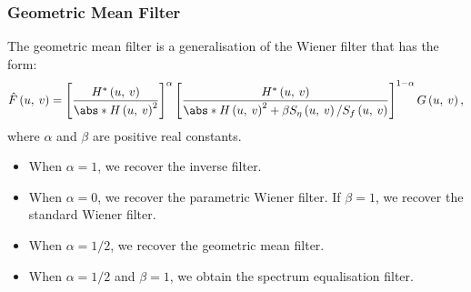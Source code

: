 \documentclass{article}
\begin{document}
\subsubsection{Geometric Mean Filter}
The geometric mean filter is a generalisation of the Wiener filter that
has the form:
\begin{equation*}
    \hat{F}\left( u,\: v \right) = \left[ \frac{H^\ast\left( u,\: v \right)}{\abs*{H\left( u,\: v \right)}^2} \right]^\alpha \left[ \frac{H^\ast\left( u,\: v \right)}{\abs*{H\left( u,\: v \right)}^2 + \beta S_\eta\left( u,\: v \right) / S_f\left( u,\: v \right)} \right]^{1 - \alpha} G\left( u,\: v \right),
\end{equation*}
where \(\alpha\) and \(\beta\) are positive real constants.
\begin{itemize}
    \item When \(\alpha = 1\), we recover the inverse filter.
    \item When \(\alpha = 0\), we recover the parametric Wiener filter.
          If \(\beta = 1\), we recover the standard Wiener filter.
    \item When \(\alpha = 1/2\), we recover the geometric mean filter.
    \item When \(\alpha = 1/2\) and \(\beta = 1\), we obtain the
          spectrum equalisation filter.
\end{itemize}
\end{document}
